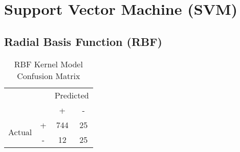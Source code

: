 \section{Support Vector Machine (SVM)}


\subsection{Radial Basis Function (RBF)}





\begin{table}[h!]
    \centering
    \begin{tabular}[h]{c c|c|c|}
        \cline{3-4}
        & & \multicolumn{2}{c|}{Predicted} \\
        \cline{3-4}
        & & + & - \\
        \hline
        \multicolumn{1}{|c|}{\multirow{2}{3em}{Actual}} & + & 744 & 25 \\
        \cline{2-4}
        \multicolumn{1}{|c|}{} & - & 12 & 25 \\
        \hline
    \end{tabular}
    \caption{\label{tab:rbf_confusion}RBF Kernel Model Confusion Matrix}
\end{table}

